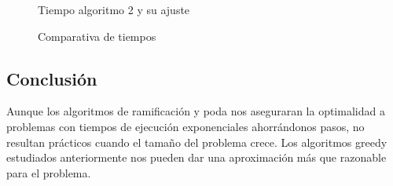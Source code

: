 \begin{figure}[H]
    \centering
    \caption{Tiempo algoritmo 2 y su ajuste}
\end{figure}


\begin{figure}[H]
    \centering
    \caption{Comparativa de tiempos}
\end{figure}



\subsection{Conclusión}
Aunque los algoritmos de ramificación y poda nos aseguraran la optimalidad a problemas con
tiempos de ejecución exponenciales ahorrándonos pasos, no resultan prácticos cuando el tamaño
del problema crece. Los algoritmos greedy estudiados anteriormente nos pueden dar una aproximación
más que razonable para el problema.